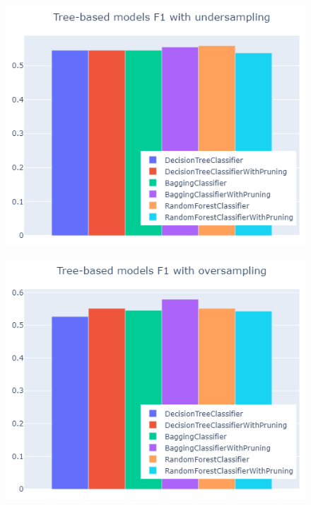 \documentclass[letterpaper]{article}
\begin{document}
	\begin{figure}[!h]
	\centering
		\begin{minipage}[t]{0.45\textwidth}
			\includegraphics[width=\textwidth]{images/trees_undersampling.png}
			\label{fig:26}
		\end{minipage}
		\begin{minipage}{0.05\textwidth}
			\quad
		\end{minipage}
		\begin{minipage}[t]{0.45\textwidth}
			\includegraphics[width=\textwidth]{images/trees_oversampling.png}
			\label{fig:27}
		\end{minipage}
	\end{figure}
\end{document}
